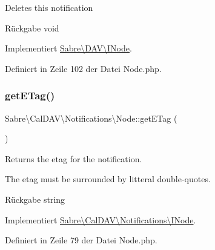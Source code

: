 Deletes this notification

\begin{DoxyReturn}{Rückgabe}
void 
\end{DoxyReturn}


Implementiert \mbox{\hyperlink{interface_sabre_1_1_d_a_v_1_1_i_node_a72cd0ee4e36dfced2b0412d14dbd73e6}{Sabre\textbackslash{}\+D\+A\+V\textbackslash{}\+I\+Node}}.



Definiert in Zeile 102 der Datei Node.\+php.

\mbox{\label{class_sabre_1_1_cal_d_a_v_1_1_notifications_1_1_node_adc6fffcad09368941ba2f17fd4273846}} 
\subsubsection{\texorpdfstring{get\+E\+Tag()}{getETag()}}
{\footnotesize\ttfamily Sabre\textbackslash{}\+Cal\+D\+A\+V\textbackslash{}\+Notifications\textbackslash{}\+Node\+::get\+E\+Tag (\begin{DoxyParamCaption}{ }\end{DoxyParamCaption})}

Returns the etag for the notification.

The etag must be surrounded by litteral double-\/quotes.

\begin{DoxyReturn}{Rückgabe}
string 
\end{DoxyReturn}


Implementiert \mbox{\hyperlink{interface_sabre_1_1_cal_d_a_v_1_1_notifications_1_1_i_node_a8c63b58470da3dd3c3f1088e3f6effc9}{Sabre\textbackslash{}\+Cal\+D\+A\+V\textbackslash{}\+Notifications\textbackslash{}\+I\+Node}}.



Definiert in Zeile 79 der Datei Node.\+php.

\mbox{\label{class_sabre_1_1_cal_d_a_v_1_1_notifications_1_1_node_a9f663d8cbb8ea36a50cdad6c46fa288a}} 
